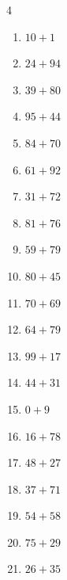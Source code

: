 \begin{multicols}{4}
\begin{enumerate}
  \item $10+1$
        \phantom{$=11$}

  \item $24+94$
        \phantom{$=118$}

  \item $39+80$
        \phantom{$=119$}

  \item $95+44$
        \phantom{$=139$}

  \item $84+70$
        \phantom{$=154$}

  \item $61+92$
        \phantom{$=153$}

  \item $31+72$
        \phantom{$=103$}

  \item $81+76$
        \phantom{$=157$}

  \item $59+79$
        \phantom{$=138$}

  \item $80+45$
        \phantom{$=125$}

  \item $70+69$
        \phantom{$=139$}

  \item $64+79$
        \phantom{$=143$}

\columnbreak %

  \item $99+17$
        \phantom{$=116$}

  \item $44+31$
        \phantom{$=75$}

  \item $0+9$
        \phantom{$=9$}

  \item $16+78$
        \phantom{$=94$}

  \item $48+27$
        \phantom{$=75$}

  \item $37+71$
        \phantom{$=108$}

  \item $54+58$
        \phantom{$=112$}

  \item $75+29$
        \phantom{$=104$}

  \item $26+35$
        \phantom{$=61$}


\end{enumerate}
\end{multicols}
